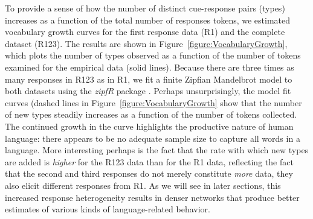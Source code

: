 \documentclass[a4paper,doc,natbib,floatsintext]{apa6}
\begin{document}
To provide a sense of how the number of distinct cue-response pairs (types) increases as a function of the total number of responses tokens, we estimated vocabulary growth curves for the first response data (R1) and the complete dataset (R123). The results are shown in Figure~\ref{figure:VocabularyGrowth}, which plots the number of types observed as a function of the number of tokens examined for the empirical data (solid lines). Because there are three times as many responses in R123 as in R1, we fit a finite Zipfian Mandelbrot model to both datasets using the {\it zipfR} package \citep{evertbaroni}. Perhaps unsurprisingly, the model fit curves (dashed lines in Figure~\ref{figure:VocabularyGrowth} show that the number of new types steadily increases as a function of the number of tokens collected. The continued growth in the curve highlights the productive nature of human language: there appears to be no adequate sample size to capture all words in a language. More interesting perhaps is the fact that the rate with which new types are added is \textit{higher} for the R123 data than for the R1 data, reflecting the fact that the second and third responses do not merely constitute \textit{more} data, they also elicit different responses from R1. As we will see in later sections, this increased response heterogeneity results in denser networks that produce better estimates of various kinds of language-related behavior.
\end{document}
